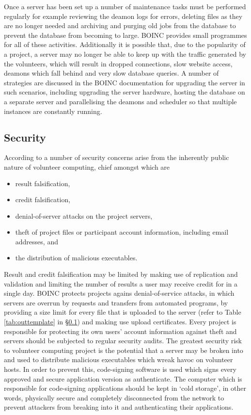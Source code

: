 Once a server has been set up a number of maintenance tasks must be performed regularly for example reviewing the deamon logs for errors, deleting files as they are no longer needed and archiving  and purging old jobs from the database to prevent the database from becoming to large. BOINC provides small programmes for all of these activities. Additionally it is possible that, due to the popularity of a project, a server may no longer be able to keep up with  the traffic generated by the volunteers, which will result in dropped connections, slow website access, deamons which fall behind and very slow database queries. A number of strategies are discussed in the BOINC documentation for upgrading the server in such scenarios, including upgrading the server hardware,  hosting the database on a separate server and  parallelising the deamons and scheduler so that multiple instances are constantly running.

\subsection{Security}
According to \cite{boincwiki} a number of security concerns arise from the inherently public nature of volunteer computing, chief amongst which are
\begin{itemize}
\item result falsification,
\item credit falsification,
\item denial-of-server attacks on the project servers, 
\item theft of project files or participant account information, including email addresses, and
\item the distribution of malicious executables.
\end{itemize}
Result and credit falsification may be limited by making use of replication and validation and limiting the number of results a user may receive credit for in a single day. 
BOINC protects projects agains denial-of-service attacks, in which servers are overrun by requests and transfers from automated programs, by providing a size limit for every file that is uploaded to the server (refer to Table \ref{tab:outtemplate} in \S \ref{}) and making use upload certificates. Every project is responsible for protecting its own users' account information against theft and servers should be subjected to regular security audits.  
The greatest security risk to volunteer computing project is the potential that a server may be broken into and used to distribute malicious executables which wreak havoc on  volunteer hosts. In order to prevent this, code-signing software is used which signs every approved and secure application version as authenticate. The computer which is responsible for code-signing applications should be kept in `cold storage', in other words, physically secure and completely disconnected from the network to prevent attackers from breaking into it and authenticating their applications. 

